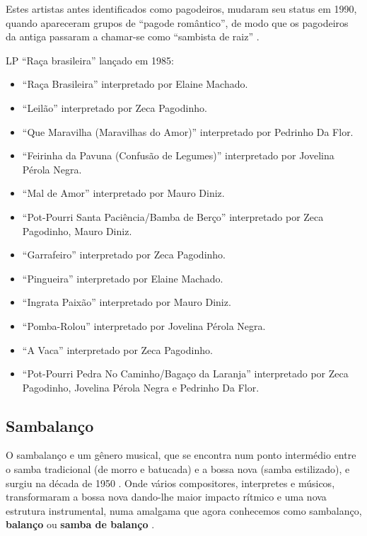 Estes artistas antes identificados como pagodeiros, mudaram seu status em 1990, 
 quando apareceram grupos de ``pagode romântico'', 
de modo que os pagodeiros da antiga passaram a chamar-se como ``sambista de raiz''  \cite{sedano2018bezerra}. 

\begin{example} LP ``Raça brasileira'' lançado em 1985:

\begin{itemize}
\item ``Raça Brasileira'' interpretado por Elaine Machado.
\item ``Leilão'' interpretado por Zeca Pagodinho.
\item ``Que Maravilha (Maravilhas do Amor)'' interpretado por Pedrinho Da Flor.
\item ``Feirinha da Pavuna (Confusão de Legumes)'' interpretado por Jovelina Pérola Negra.
\item ``Mal de Amor''  interpretado por  Mauro Diniz.
\item ``Pot-Pourri Santa Paciência/Bamba de Berço'' interpretado por Zeca Pagodinho, Mauro Diniz.
\item ``Garrafeiro'' interpretado por Zeca Pagodinho.
\item ``Pingueira'' interpretado por Elaine Machado.
\item ``Ingrata Paixão'' interpretado por Mauro Diniz.
\item ``Pomba-Rolou'' interpretado por  Jovelina Pérola Negra.
\item ``A Vaca'' interpretado por Zeca Pagodinho.
\item ``Pot-Pourri Pedra No Caminho/Bagaço da Laranja'' interpretado por Zeca Pagodinho, Jovelina Pérola Negra e Pedrinho Da Flor.
\end{itemize}
\end{example}

\subsection{Sambalanço}
\label{ref:sambalanco}
O sambalanço e um gênero musical,
que se encontra num ponto intermédio entre o samba tradicional (de morro e batucada)
e a bossa nova (samba estilizado), e surgiu na década de 1950 \cite[pp. 119]{diniz2008almanaque}.
Onde vários compositores, interpretes e músicos, 
transformaram a bossa nova dando-lhe maior impacto rítmico e uma nova estrutura instrumental,
numa amalgama que agora conhecemos como sambalanço, \textbf{balanço} ou \textbf{samba de balanço} \cite{de2017sambalanco}.

